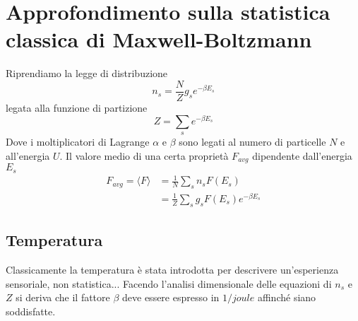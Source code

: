 
\section{Approfondimento sulla statistica classica di Maxwell-Boltzmann}

Riprendiamo la legge di distribuzione
\begin{equation}
n_s = \frac{N}{Z} g_s e^{ - \beta E_s }
\label{leg_dist_ns}
\end{equation}
legata alla funzione di partizione
\begin{equation}
Z = \sum_s e^{ - \beta E_s }
\label{fun_part}
\end{equation}
Dove i moltiplicatori di Lagrange $\alpha$ e $\beta$ sono legati al numero di particelle $N$ e all'energia $U$.
Il valore medio di una certa proprietà $F_{avg}$ dipendente dall'energia $E_s$
\begin{equation}
\begin{split}
F_{avg} = \langle F \rangle & =  \frac{1}{N} \sum_s n_s F(E_s) \\
& = \frac{1}{Z} \sum_s g_s F(E_s) e^{- \beta E_s}
\end{split}
\end{equation}

\subsection{Temperatura}
Classicamente la temperatura è stata introdotta per descrivere un'esperienza sensoriale, non statistica...
Facendo l'analisi dimensionale delle equazioni di $n_s$ e $Z$ si deriva che il fattore $\beta$ deve essere espresso in $1/joule$
affinché siano soddisfatte.

